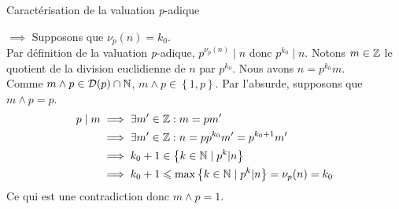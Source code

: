 \documentclass{article}
\renewenvironment{question_kholle}[2][ ]
{
	\subsection{\texorpdfstring{#2}{}}
	\notblank{#1}
	{
		\noindent #1
		\bigbreak
	}
	{}
	\begin{proof}
}
{
	\end{proof}
}
\begin{document}
	\begin{question_kholle}
		[Soit $n \in \N^*, p \in \Prime, k_0 \in \N$.
		\begin{equation}
			\nu_p(n) = k_0 \iff
			\exists m \in \Z : \left\{ \begin{matrix}
				n = p^{k_0} \\
				m \wedge p = 1
			\end{matrix} \right.
		\end{equation}
		]
		{Caractérisation de la valuation \textit{p}-adique}

		$\implies$ Supposons que $\nu_p(n) = k_0$. \\
		Par définition de la valuation \textit{p}-adique, $p^{\nu_p(n)} \;|\; n$ donc $p^{k_0} \;|\; n$.
		Notons $m \in \mathbb Z$ le quotient de la division euclidienne de $n$ par $p^{k_0}$. Nous avons $n = p^{k_0} m$. \\
		Comme $m \wedge p \in \mathcal{D}(p) \cap \mathbb N$, $m \wedge p \in \left\{1,p\right\}$.
		Par l'absurde, supposons que $m \wedge p = p$.
		\begin{equation*}
			\begin{aligned}
				p \;|\; m
				&\implies \exists m' \in \mathbb Z : m = p m' \\
				&\implies \exists m' \in \mathbb Z : n = p p^{k_0} m' = p^{k_0+1} m' \\
				&\implies k_0 + 1 \in \left\{ k \in \mathbb N \;|\; p^k | n \right\} \\
				&\implies k_0 + 1 \leqslant \max \left\{ k \in \mathbb N \;|\; p^k | n \right\} = \nu_p(n) = k_0
			\end{aligned}
		\end{equation*}
		Ce qui est une contradiction donc $m \wedge p = 1$.


\end{question_kholle}
\end{document}
